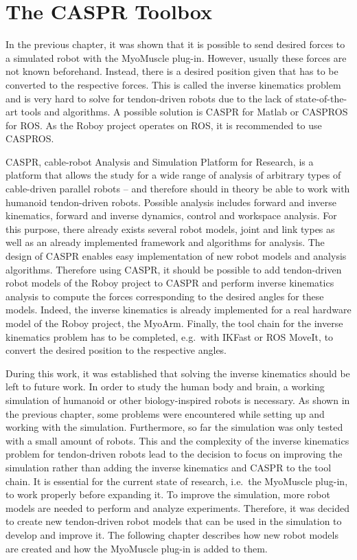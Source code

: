 
\chapter{The CASPR Toolbox}\label{chapter:CASPR}

In the previous chapter, it was shown that it is possible to send desired forces to a simulated robot with the MyoMuscle plug-in. However, usually these forces are not known beforehand. Instead, there is a desired position given that has to be converted to the respective forces. This is called the inverse kinematics problem and is very hard to solve for tendon-driven robots due to the lack of state-of-the-art tools and algorithms. A possible solution is CASPR for Matlab or CASPROS for ROS\cite{CASPR}. As the Roboy project operates on ROS, it is recommended to use CASPROS.

CASPR, cable-robot Analysis and Simulation Platform for Research, is a platform that allows the study for a wide range of analysis of arbitrary types of cable-driven parallel robots\cite{CASPR} – and therefore should in theory be able to work with humanoid tendon-driven robots. Possible analysis includes forward and inverse kinematics, forward and inverse dynamics, control and workspace analysis. For this purpose, there already exists several robot models, joint and link types as well as an already implemented framework and algorithms for analysis. The design of CASPR enables easy implementation of new robot models and analysis algorithms\cite{CASPR}. Therefore using CASPR, it should be possible to add tendon-driven robot models of the Roboy project to CASPR and perform inverse kinematics analysis to compute the forces corresponding to the desired angles for these models. Indeed, the inverse kinematics is already implemented for a real hardware model of the Roboy project, the MyoArm\cite{CASPR}. Finally, the tool chain for the inverse kinematics problem has to be completed, e.g.\ with IKFast\cite{openrave} or ROS MoveIt\cite{moveit}, to convert the desired position to the respective angles.

During this work, it was established that solving the inverse kinematics should be left to future work. In order to study the human body and brain, a working simulation of humanoid or other biology-inspired robots is necessary. As shown in the previous chapter, some problems were encountered while setting up and working with the simulation. Furthermore, so far the simulation was only tested with a small amount of robots. This and the complexity of the inverse kinematics problem for tendon-driven robots lead to the decision to focus on improving the simulation rather than adding the inverse kinematics and CASPR to the tool chain. It is essential for the current state of research, i.e.\ the MyoMuscle plug-in, to work properly before expanding it. To improve the simulation, more robot models are needed to perform and analyze experiments. Therefore, it was decided to create new tendon-driven robot models that can be used in the simulation to develop and improve it. The following chapter describes how new robot models are created and how the MyoMuscle plug-in is added to them.